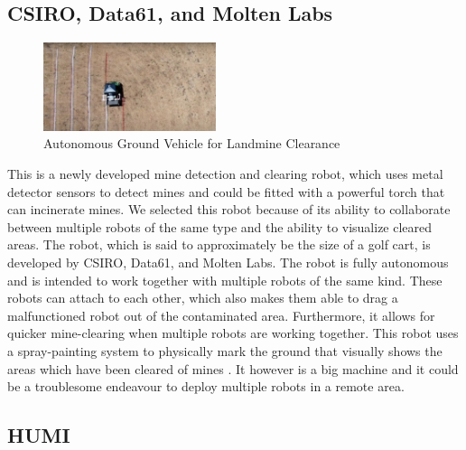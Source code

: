 \subsection{CSIRO, Data61, and Molten Labs}

\begin{figure}
    \centering
      \includegraphics[width=0.45\textwidth]{00 - Images/autonomous_ground_vehicle_for_landmine_clearance.jpg}
  \caption{Autonomous Ground Vehicle for Landmine Clearance \cite{CSIRO2020}}
  \label{fig:autonomous_ground_vehicle_for_landmine_clearance}
\end{figure}
This is a newly developed mine detection and clearing robot, which uses metal detector sensors to detect mines and could be fitted with a powerful torch that can incinerate mines. We selected this robot because of its ability to collaborate between multiple robots of the same type and the ability to visualize cleared areas. The robot, which is said to approximately be the size of a golf cart, is developed by CSIRO, Data61, and Molten Labs. The robot is fully autonomous and is intended to work together with multiple robots of the same kind. These robots can attach to each other, which also makes them able to drag a malfunctioned robot out of the contaminated area. Furthermore, it allows for quicker mine-clearing when multiple robots are working together. This robot uses a spray-painting system to physically mark the ground that visually shows the areas which have been cleared of mines \cite{CSIRO2020}. It however is a big machine and it could be a troublesome endeavour to deploy multiple robots in a remote area.


\subsection{HUMI}

